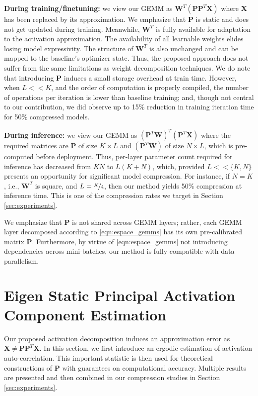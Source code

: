 \documentclass{article}
\theoremstyle{plain}
\begin{document}
\textbf{During training/finetuning:} we view our GEMM as $\mathbf{W}^T \left(\mathbf{P} \mathbf{P}^T \mathbf{X}\right)$ where $\mathbf{X}$ has been replaced by its approximation. We emphasize that $\mathbf{P}$ is static and does not get updated during training. Meanwhile, $\mathbf{W}^T$ is fully available for adaptation to the activation approximation. The availability of all learnable weights elides losing model expressivity. The structure of $\mathbf{W}^T$ is also unchanged and can be mapped to the baseline's optimizer state. Thus, the proposed approach does not suffer from the same limitations as weight decomposition techniques. We do note that introducing $\mathbf{P}$ induces a small storage overhead at train time. However, when $L<<K$, and the order of computation is properly compiled, the number of operations per iteration is lower than baseline training; and, though not central to our contribution, we did observe up to 15\% reduction in training iteration time for 50\% compressed models.

\textbf{During inference:} we view our GEMM as $\left( \mathbf{P}^T \mathbf{W}\right)^T\left(\mathbf{P}^T \mathbf{X}\right)$ where the required matrices are $\mathbf{P}$ of size $K \times L$ and $\left( \mathbf{P}^T \mathbf{W}\right)$ of size $N\times L$, which is pre-computed before deployment. Thus, per-layer parameter count required for inference has decreased from $KN$ to $L (K+N)$, which, provided $L<<\{K,N\}$ presents an opportunity for significant model compression. For instance, if $N=K$, i.e., $\mathbf{W}^T$ is square, and $L=\nicefrac{K}{4}$, then our method yields 50\% compression at inference time. This is one of the compression rates we target in Section \ref{sec:experiments}.

We emphasize that $\mathbf{P}$ is not shared across GEMM layers; rather, each GEMM layer decomposed according to \eqref{eqn:espace_gemms} has its own pre-calibrated matrix $\mathbf{P}$. Furthermore, by virtue of \eqref{eqn:espace_gemms} not introducing dependencies across mini-batches, our method is fully compatible with data parallelism.



\section{Eigen Static Principal Activation Component Estimation}
\label{sec:theory}
Our proposed activation decomposition induces an approximation error as  $\mathbf{X}\neq\mathbf{P} \mathbf{P}^T \mathbf{X}$. In this section, we first introduce an ergodic estimation of activation auto-correlation. This important statistic is then used for theoretical constructions of $\mathbf{P}$ with guarantees on computational accuracy. Multiple results are presented and then combined in our compression studies in Section \ref{sec:experiments}.
\end{document}
